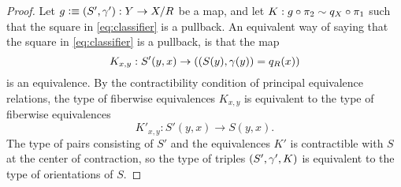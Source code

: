 \begin{proof}
Let $g\vcentcolon\equiv{\mathopen{}(S',\gamma')\mathclose{}}:Y\to X/R$ be a map, and let $K:g\circ\pi_2\sim q_X\circ \pi_1$ such that the square in \autoref{eq:classifier} is a pullback. An equivalent way of saying that the square in \autoref{eq:classifier} is a pullback, is that the map
\begin{equation*}
K_{x,y}: S'(y,x)\to ({\mathopen{}(S(y),\gamma(y))\mathclose{}}=q_R(x))
\end{equation*}
is an equivalence. By the contractibility condition of principal equivalence relations, the type of fiberwise equivalences $K_{x,y}$ is equivalent to the type of fiberwise equivalences
\begin{equation*}
K'_{x,y} : S'(y,x)\to S(y,x).
\end{equation*}
The type of pairs consisting of $S'$ and the equivalences $K'$ is contractible with $S$ at the center of contraction, so the type of triples ${\mathopen{}(S',\gamma',K)\mathclose{}}$ is equivalent to the type of orientations of $S$.
\begin{comment}
\begin{equation*}
\prd{y:Y}\mathcal{O}_R(S(y))
\end{equation*}

Let $\gamma$ be an $R$-orientation of $S$, and define $g\defeq\pairr{S,\gamma}:Y\to X/R$. 
By the contractibility condition of principal equivalence relations, we obtain a fiberwise equivalence
\begin{equation*}
H^\gamma_{x,y}:\eqv{S(y,x)}{(g(y)=q_R(x))}
\end{equation*}
which serves at the same time as a homotopy of type $\pi_2\circ g\htpy \pi_1\circ q_X$. 
From the fact that $H_{x,y}$ we see that the square is a pullback.

Now we need to show that the map $\varphi\defeq\gamma\mapsto\pairr{\pairr{S,\gamma},H^\gamma}$ is an equivalence. Consider a map $g\defeq\pairr{S',\gamma'}:Y\to X/R$ and a homotopy
$K:g\circ\pi_2\htpy q_X\circ \pi_1$ such that the square in \autoref{eq:classifier} is a pullback. An equivalent way of saying that the square in \autoref{eq:classifier} is a pullback, is that the map
\begin{equation*}
K_{x,y}: S'(y,x)\to (g(y)=q_R(x))
\end{equation*}
is an equivalence for each $x:X$ and $y:Y$.


\end{comment}
\end{proof}
